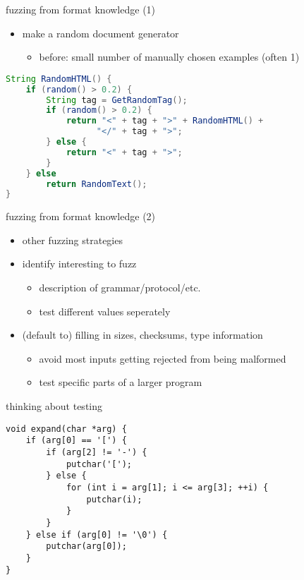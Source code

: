 \begin{frame}[fragile,label=formatKnow]{fuzzing from format knowledge (1)}
    \begin{itemize}
        \item make a random document generator
            \begin{itemize}
                \item before: small number of manually chosen examples (often 1)
            \end{itemize}
    \end{itemize}
    \begin{lstlisting}[language=Java, style=small]
String RandomHTML() {
    if (random() > 0.2) {
        String tag = GetRandomTag();
        if (random() > 0.2) {
            return "<" + tag + ">" + RandomHTML() +
                  "</" + tag + ">";
        } else {
            return "<" + tag + ">";
        }
    } else
        return RandomText();
}
\end{lstlisting}
\end{frame}

\begin{frame}[fragile,label=formatKnow2]{fuzzing from format knowledge (2)}
    \begin{itemize}
        \item other fuzzing strategies
        \vspace{.5cm}
    \item identify interesting  to fuzz
            \begin{itemize}
                \item description of grammar/protocol/etc.
                \item test different values seperately
            \end{itemize}
        \item (default to) filling in sizes, checksums, type information
            \begin{itemize}
                \item avoid most inputs getting rejected from being malformed
                \item test specific parts of a larger program
            \end{itemize}
    \end{itemize}
\end{frame}

\begin{frame}[fragile,label=testExample]{thinking about testing}
    \lstset{language=C,style=smaller}
\begin{lstlisting}
void expand(char *arg) {
    if (arg[0] == '[') {
        if (arg[2] != '-') {
            putchar('[');
        } else {
            for (int i = arg[1]; i <= arg[3]; ++i) {
                putchar(i);
            }
        }
    } else if (arg[0] != '\0') {
        putchar(arg[0]);
    }
}
\end{lstlisting}
\end{frame}

